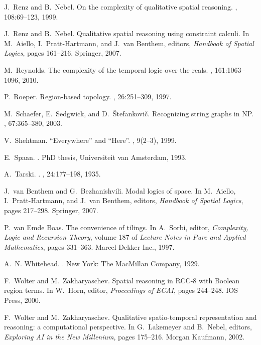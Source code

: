 \documentclass{LMCS}
\theoremstyle{plain}
\begin{document}
\begin{thebibliography}{10}
J.~Renz and B.~Nebel.
\newblock On the complexity of qualitative spatial reasoning.
, 108:69--123, 1999.

J.~Renz and B.~Nebel.
\newblock Qualitative spatial reasoning using constraint calculi.
\newblock In M.~Aiello, I.~Pratt-Hartmann, and J.~van Benthem, editors, {\em
  Handbook of Spatial Logics}, pages 161--216. Springer, 2007.

M.~Reynolds.
\newblock The complexity of the temporal logic over the reals.
, 161:1063--1096, 2010.

P.~Roeper.
\newblock Region-based topology.
, 26:251--309, 1997.

M.~Schaefer, E.~Sedgwick, and D.~{\v{S}}tefankovi{\v{c}}.
\newblock Recognizing string graphs in NP.
, 67:365--380, 2003.

V.~Shehtman.
\newblock ``{E}verywhere'' and ``{H}ere''.
, 9(2--3), 1999.

E.~Spaan.
.
\newblock PhD thesis, Universiteit van Amsterdam, 1993.

A.~Tarski.
.
, 24:177--198, 1935.

J.~van Benthem and G.~Bezhanishvili.
\newblock Modal logics of space.
\newblock In M.~Aiello, I.~Pratt-Hartmann, and J.~van Benthem, editors, {\em
  Handbook of Spatial Logics}, pages 217--298. Springer, 2007.

P.~van {Emde Boas}.
\newblock The convenience of tilings.
\newblock In A.~Sorbi, editor, {\em Complexity, Logic and Recursion Theory},
  volume 187 of {\em Lecture Notes in Pure and Applied Mathematics}, pages
  331--363. Marcel Dekker Inc., 1997.

A.~N. Whitehead.
.
\newblock New York: The MacMillan Company, 1929.

F.~Wolter and M.~Zakharyaschev.
\newblock Spatial reasoning in {RCC-8} with {B}oolean region terms.
\newblock In W.~Horn, editor, {\em Proceedings of ECAI}, pages 244--248. IOS
  Press, 2000.

F.~Wolter and M.~Zakharyaschev.
\newblock Qualitative spatio-temporal representation and reasoning: a
  computational perspective.
\newblock In G.~Lakemeyer and B.~Nebel, editors, {\em Exploring AI in the New
  Millenium}, pages 175--216. Morgan Kaufmann, 2002.

\end{thebibliography}
\end{document}
